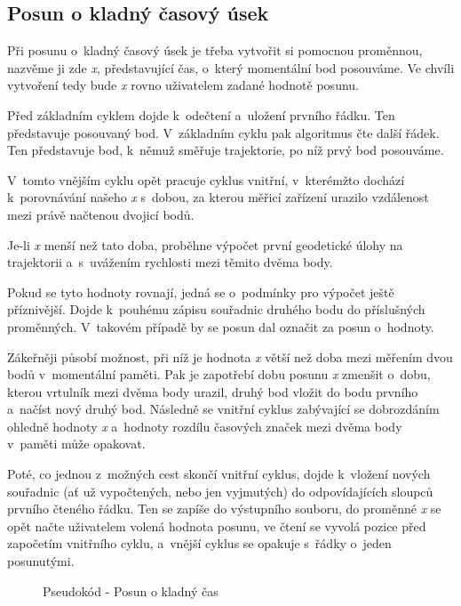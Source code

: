 \subsection{Posun o kladný časový úsek}
\label{kladnycas}

Při posunu o~kladný časový úsek je třeba vytvořit si pomocnou proměnnou, nazvěme ji zde \textit{x},
představující čas, o~který momentální bod posouváme. Ve chvíli vytvoření tedy bude \textit{x}
rovno uživatelem zadané hodnotě posunu. 

Před základním cyklem dojde k~odečtení a~uložení prvního řádku. Ten představuje posouvaný bod.
V~základním cyklu pak algoritmus čte další řádek. Ten představuje bod, k~němuž směřuje
trajektorie, po níž prvý bod posouváme. 

V~tomto vnějším cyklu opět pracuje cyklus vnitřní, v~kterémžto dochází k~porov\-ná\-vá\-ní našeho
\textit{x} s~dobou, za kterou měřicí zařízení urazilo vzdálenost mezi právě načtenou dvojicí bodů. 

Je-li \textit{x} menší než tato doba, proběhne výpočet první geodetické úlohy na trajektorii
a~s~uvážením rychlosti mezi těmito dvěma body. 

Pokud se tyto hodnoty rovnají, jedná se o~podmínky pro výpočet ještě příznivější. Dojde k~pouhému
zápisu souřadnic druhého bodu do příslušných proměnných. V~ta\-ko\-vém
případě by se posun dal označit za posun o~hodnoty. 

Zákeřněji působí možnost, při níž je hodnota \textit{x} větší než doba mezi měřením dvou
bodů v~momentální paměti. Pak je zapotřebí dobu posunu \textit{x} zmenšit o~dobu, kterou
vrtulník mezi dvěma body urazil, druhý bod vložit do bodu prvního a~načíst nový druhý bod. Následně
se vnitřní cyklus zabývající se dobrozdáním ohledně hodnoty \textit{x} a~hodnoty
rozdílu časových značek mezi dvěma body v~paměti může opakovat. 

Poté, co jednou z~možných cest skončí vnitřní cyklus, dojde k~vložení nových souřadnic
(ať už vypočtených, nebo jen vyjmutých) do odpovídajících sloupců první\-ho čteného řádku.
Ten se zapíše do výstupního souboru, do proměnné \textit{x} se opět načte uživatelem volená
hodnota posunu, ve čtení se vyvolá pozice před započetím vnitřního cyklu, a~vnější cyklus se
opakuje s~řádky o~jeden posunutými. 

    \begin{figure}[h]
    \centering
    \begin{algorithmic}[1]
    \ENDWHILE
    \ENDWHILE
    \end{algorithmic}
    \caption{Pseudokód - Posun o kladný čas}
    \label{fig:pseudokladnycas}
    \end{figure}

